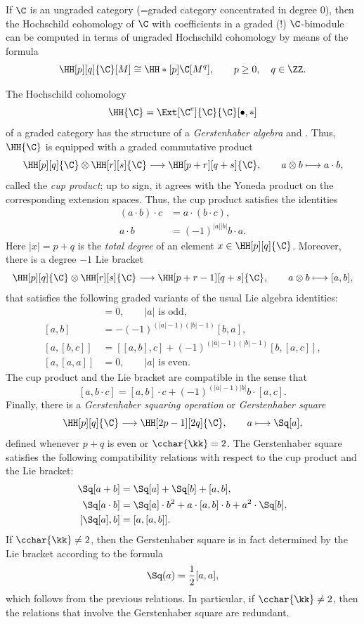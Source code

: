 \documentclass[a4paper]{amsart}
\begin{document}
If $\C$ is an ungraded category (=graded category concentrated in degree $0$),
then the Hochschild cohomology of $\C$ with coefficients in a graded (!)
$\C$-bimodule can be computed in terms of ungraded Hochschild cohomology by
means of the formula
\[
  \HH[p][q]{\C}[M]\cong\HH*[p]{\C}[M^q],\qquad p\geq0,\quad q\in\ZZ.
\]

The Hochschild cohomology
\[
  \HH{\C}=\Ext[\C^e]{\C}{\C}[\bullet,*]
\]
of a graded category has the structure of a \emph{Gerstenhaber algebra}
\cite{Ger63} and \cite[Sec.~1]{Mur20b}. Thus, $\HH{\C}$ is equipped with a
graded commutative product
\[
  \HH[p][q]{\C}\otimes\HH[r][s]{\C}\longrightarrow\HH[p+r][q+s]{\C},\qquad
  a\otimes b\longmapsto a\cdot b,
\]
called the \emph{cup product}; up to sign, it agrees with the Yoneda product on the
corresponding extension spaces. Thus, the cup product satisfies the identities
\begin{align*}
  (a\cdot b)\cdot c & =a\cdot (b\cdot c),     \\
  a\cdot b          & =(-1)^{|a||b|}b\cdot a.
\end{align*}
Here $|x|=p+q$ is the \emph{total degree} of an element $x\in \HH[p][q]{\C}$. 
Moreover, there is a degree $-1$ Lie bracket
\[
  \HH[p][q]{\C}\otimes\HH[r][s]{\C}\longrightarrow\HH[p+r-1][q+s]{\C},\qquad
  a\otimes b\longmapsto [a,b],
\]
that satisfies the following graded variants of the usual Lie algebra
identities:
\begin{align*}
  [a,a]     & =0,\qquad |a|\text{ is odd},               \\
  [a,b]     & =-(-1)^{(|a|-1)(|b|-1)}[b,a],              \\
  [a,[b,c]] & =[[a,b],c]+(-1)^{(|a|-1)(|b|-1)}[b,[a,c]], \\
  [a,[a,a]] & =0,\qquad |a|\text{ is even}.
\end{align*}
The cup product and the Lie bracket are compatible in the sense that
\[
  [a,b\cdot c]=[a,b]\cdot c+(-1)^{(|a|-1)|b|}b\cdot[a,c].
\]
Finally, there is a \emph{Gerstenhaber squaring operation} or \emph{Gerstenhaber
  square}
\[
  \HH[p][q]{\C}\longrightarrow\HH[2p-1][2q]{\C},\qquad a\longmapsto\Sq[a],
\]
defined whenever $p+q$ is even or $\cchar{\kk}=2$. The Gerstenhaber square
satisfies the following compatibility relations with respect to the cup product
and the Lie bracket:
\begin{align*}
  \Sq[a+b]      & =\Sq[a]+\Sq[b]+[a,b],                               \\
  \Sq[a\cdot b] & =\Sq[a]\cdot b^2+a\cdot[a,b]\cdot b+a^2\cdot\Sq[b], \\
  [\Sq[a],b]    & =[a,[a,b]].
\end{align*}
If $\cchar{\kk}\neq2$, then the Gerstenhaber square is in fact determined by the
Lie bracket according to the formula
\[
  \Sq(a)=\frac{1}{2}[a,a],
\]
which follows from the previous relations. In particular, if $\cchar{\kk}\neq2$,
then the relations that involve the Gerstenhaber square are redundant.
\end{document}
